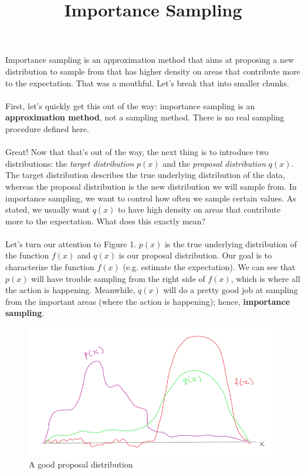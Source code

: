 \documentclass[10pt,a4paper]{article}
\title{Importance Sampling}
\begin{document}
\maketitle 

Importance sampling is an approximation method that aims at proposing a new distribution to sample from that has higher density on areas that contribute more to the expectation. That was a mouthful. Let's break that into smaller chunks.\\
\\
\indent First, let's quickly get this out of the way: importance sampling is an \textbf{approximation method}, not a sampling method. There is no real sampling procedure defined here.\\
\\
\indent Great! Now that that's out of the way, the next thing is to introduce two distributions: the \textit{target distribution} $p(x)$ and the \textit{proposal distribution} $q(x)$. The target distribution describes the true underlying distribution of the data, whereas the proposal distribution is the new distribution we will sample from. In importance sampling, we want to control how often we sample certain values. As stated, we usually want $q(x)$ to have high density on areas that contribute more to the expectation. What does this exactly mean?\\
\\
\indent Let's turn our attention to Figure 1. $p(x)$ is the true underlying distribution of the function $f(x)$ and $q(x)$ is our proposal distribution. Our goal is to characterize the function $f(x)$ (e.g. estimate the expectation). We can see that $p(x)$ will have trouble sampling from the right side of $f(x)$, which is where all the action is happening. Meanwhile, $q(x)$ will do a pretty good job at sampling from the important areas (where the action is happening); hence, \textbf{importance sampling}.

\begin{figure}
\centering
\includegraphics[scale=0.5]{intuition.png}
\caption{A good proposal distribution}
\end{figure}
\end{document}
